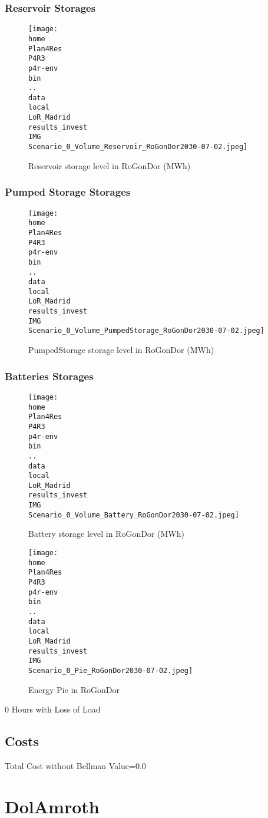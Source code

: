 \documentclass[10pt]{report}
\begin{document}
\subsubsection{Reservoir Storages}
\begin{figure}[H]
\centering
\texttt{[image: \\home\\Plan4Res\\P4R3\\p4r-env\\bin\\..\\data\\local\\LoR\_Madrid\\results\_invest\\IMG\\Scenario\_0\_Volume\_Reservoir\_RoGonDor2030-07-02.jpeg]}
\caption{Reservoir storage level in RoGonDor (MWh)}
\label{fig:Scenario_0_Volume_Reservoir_RoGonDor2030-07-02.jpeg}
\end{figure}
\subsubsection{Pumped Storage Storages}
\begin{figure}[H]
\centering
\texttt{[image: \\home\\Plan4Res\\P4R3\\p4r-env\\bin\\..\\data\\local\\LoR\_Madrid\\results\_invest\\IMG\\Scenario\_0\_Volume\_PumpedStorage\_RoGonDor2030-07-02.jpeg]}
\caption{PumpedStorage storage level in RoGonDor (MWh)}
\label{fig:Scenario_0_Volume_PumpedStorage_RoGonDor2030-07-02.jpeg}
\end{figure}
\subsubsection{Batteries Storages}
\begin{figure}[H]
\centering
\texttt{[image: \\home\\Plan4Res\\P4R3\\p4r-env\\bin\\..\\data\\local\\LoR\_Madrid\\results\_invest\\IMG\\Scenario\_0\_Volume\_Battery\_RoGonDor2030-07-02.jpeg]}
\caption{Battery storage level in RoGonDor (MWh)}
\label{fig:Scenario_0_Volume_Battery_RoGonDor2030-07-02.jpeg}
\end{figure}
\begin{figure}[H]
\centering
\texttt{[image: \\home\\Plan4Res\\P4R3\\p4r-env\\bin\\..\\data\\local\\LoR\_Madrid\\results\_invest\\IMG\\Scenario\_0\_Pie\_RoGonDor2030-07-02.jpeg]}
\caption{Energy Pie in RoGonDor}
\label{fig:Scenario_0_Pie_RoGonDor2030-07-02.jpeg}
\end{figure}
0 Hours with Loss of Load

\subsection{Costs}

Total Cost without Bellman Value=0.0
\newpage\section{DolAmroth}
\end{document}
